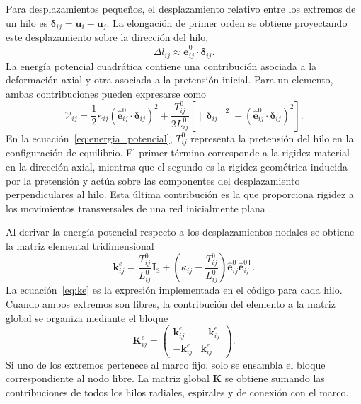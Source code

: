 \documentclass[11pt,letterpaper]{article}
\begin{document}
Para desplazamientos pequeños, el desplazamiento relativo entre los extremos de un hilo es $\boldsymbol{\delta}_{ij}=\mathbf u_i-\mathbf u_j$. La elongación de primer orden se obtiene proyectando este desplazamiento sobre la dirección del hilo,
\begin{equation}
\Delta l_{ij}\approx \hat{\mathbf e}_{ij}^{0}\cdot\boldsymbol{\delta}_{ij}.
\label{eq:elongacion}
\end{equation}
La energía potencial cuadrática contiene una contribución asociada a la deformación axial y otra asociada a la pretensión inicial. Para un elemento, ambas contribuciones pueden expresarse como
\begin{equation}
\mathcal{V}_{ij}=\frac{1}{2}\kappa_{ij}
\left(\hat{\mathbf e}_{ij}^{0}\cdot\boldsymbol{\delta}_{ij}\right)^2
+\frac{T_{ij}^{0}}{2L_{ij}^{0}}
\left[\|\boldsymbol{\delta}_{ij}\|^2-
\left(\hat{\mathbf e}_{ij}^{0}\cdot\boldsymbol{\delta}_{ij}\right)^2\right].
\label{eq:energia_potencial}
\end{equation}
En la ecuación~\eqref{eq:energia_potencial}, $T_{ij}^{0}$ representa la pretensión del hilo en la configuración de equilibrio. El primer término corresponde a la rigidez material en la dirección axial, mientras que el segundo es la rigidez geométrica inducida por la pretensión y actúa sobre las componentes del desplazamiento perpendiculares al hilo. Esta última contribución es la que proporciona rigidez a los movimientos transversales de una red inicialmente plana \cite{jayaraman1981,meirovitch2001}.

Al derivar la energía potencial respecto a los desplazamientos nodales se obtiene la matriz elemental tridimensional
\begin{equation}
\mathbf{k}_{ij}^{e}=\frac{T_{ij}^{0}}{L_{ij}^{0}}\mathbf I_3+
\left(\kappa_{ij}-\frac{T_{ij}^{0}}{L_{ij}^{0}}\right)
\hat{\mathbf e}_{ij}^{0}\hat{\mathbf e}_{ij}^{0\mathsf T}.
\label{eq:ke}
\end{equation}
La ecuación~\eqref{eq:ke} es la expresión implementada en el código para cada hilo. Cuando ambos extremos son libres, la contribución del elemento a la matriz global se organiza mediante el bloque
\begin{equation}
\mathbf K_{ij}^{e}=\begin{pmatrix}
\mathbf k_{ij}^{e} & -\mathbf k_{ij}^{e}\\
-\mathbf k_{ij}^{e} & \mathbf k_{ij}^{e}
\end{pmatrix}.
\label{eq:Ke6}
\end{equation}
Si uno de los extremos pertenece al marco fijo, solo se ensambla el bloque correspondiente al nodo libre. La matriz global $\mathbf K$ se obtiene sumando las contribuciones de todos los hilos radiales, espirales y de conexión con el marco.
\end{document}

